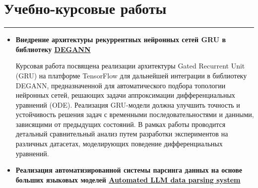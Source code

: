 \documentclass[a4paper,14pt]{article}
\begin{document}
\section*{Учебно-курсовые работы}
\hrule
\vspace{0.5em}
\begin{itemize}
\item \textbf{Внедрение архитектуры рекуррентных нейронных сетей GRU в библиотеку \href{https://github.com/Krekep/degann}{DEGANN}}

Курсовая работа посвящена реализации архитектуры Gated Recurrent Unit (GRU) на платформе TensorFlow для дальнейшей интеграции в библиотеку DEGANN, предназначенной для автоматического подбора топологии нейронных сетей, решающих задачи аппроксимации дифференциальных уравнений (ODE). Реализация GRU-модели должна улучшить точность и устойчивость решения задач с временными последовательностями и данными, зависящими от предыдущих состояний. В рамках работы проводится детальный сравнительный анализ путем разработки экспериментов на различных датасетах, моделирующих поведение дифференциальных уравнений.

\item \textbf{Реализация автоматизированной системы парсинга данных на основе больших языковых моделей \href{https://github.com/Denigmma/Automated_LLM_data_parsing_system}{Automated LLM data parsing system}}

\end{itemize}
\end{document}

